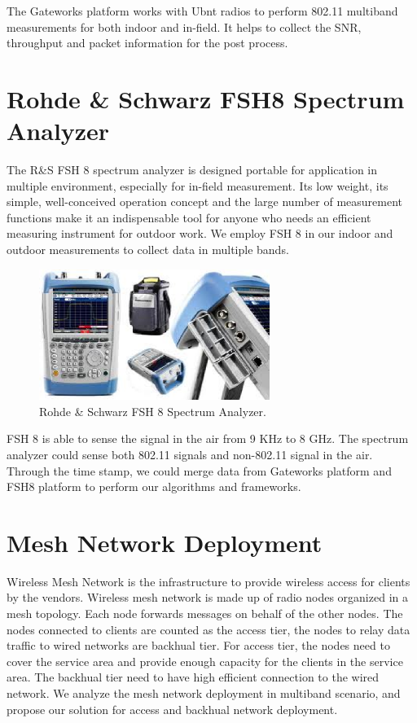 The Gateworks platform works with Ubnt radios to perform 802.11 
multiband measurements for both indoor and in-field. It helps to 
collect the SNR, throughput and packet information for the post 
process. 

\section{Rohde \& Schwarz FSH8 Spectrum Analyzer}

The R\&S FSH 8 spectrum analyzer is designed portable for application 
in multiple environment, especially for in-field measurement. Its low 
weight, its simple, well-conceived operation concept and the large number 
of measurement functions make it an indispensable tool for anyone who 
needs an efficient measuring instrument for outdoor work. We employ 
FSH 8 in our indoor and outdoor measurements to collect data in multiple
bands.

\begin{figure} 
\centering
\includegraphics[width=75mm]{figures/fsh8}
\vspace{-0.1in}
\caption{Rohde \& Schwarz FSH 8 Spectrum Analyzer.}
\label{fig:fsh8}
\vspace{0.1in}
\end{figure}

FSH 8 is able to sense the signal in the air from 9 KHz to 
8 GHz. The spectrum analyzer could sense both 802.11 signals 
and non-802.11 signal in the air. Through the time stamp, 
we could merge data from Gateworks platform and FSH8 platform 
to perform our algorithms and frameworks.

\section{Mesh Network Deployment}

Wireless Mesh Network is the infrastructure to provide 
wireless access for clients by the vendors. Wireless 
mesh network is made up of radio nodes organized in a mesh 
topology. Each node forwards messages on behalf of the 
other nodes. The nodes connected to clients are counted 
as the access tier, the nodes to relay data traffic to 
wired networks are backhual tier. For access tier, the 
nodes need to cover the service area and provide enough 
capacity for the clients in the service area. The backhual 
tier need to have high efficient connection to the wired 
network. We analyze the mesh network deployment in multiband 
scenario, and propose our solution for access and backhual 
network deployment.

